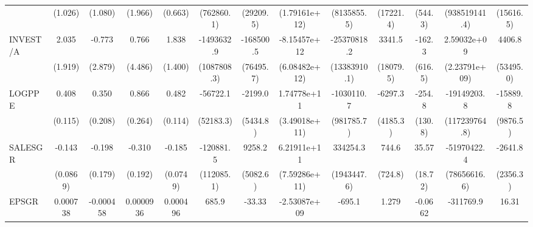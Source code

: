 \begin{table}[htbp]
\begin{tabular}{l*{12}{c}}
                    &     (1.026)         &     (1.080)         &     (1.966)         &     (0.663)         &  (762860.1)         &   (29209.5)         &(1.79161e+12)         & (8135855.5)         &   (17221.4)         &     (544.3)         &(938519141.4)         &   (15616.5)         \\
INVEST/A            &       2.035         &      -0.773         &       0.766         &       1.838         &  -1493632.9         &   -168500.5\sym{**} &-8.15457e+12         & -25370818.2\sym{*}  &      3341.5         &      -162.3         & 2.59032e+09         &      4406.8         \\
                    &     (1.919)         &     (2.879)         &     (4.486)         &     (1.400)         & (1087808.3)         &   (76495.7)         &(6.08482e+12)         &(13383910.1)         &   (18079.5)         &     (616.5)         &(2.23791e+09)         &   (53495.0)         \\
LOGPPE              &       0.408\sym{***}&       0.350         &       0.866\sym{***}&       0.482\sym{***}&    -56722.1         &     -2199.0         & 1.74778e+11         &  -1030110.7         &     -6297.3         &      -254.8\sym{*}  & -19149203.8         &    -15889.8         \\
                    &     (0.115)         &     (0.208)         &     (0.264)         &     (0.114)         &   (52183.3)         &    (5434.8)         &(3.49018e+11)         &  (981785.7)         &    (4185.3)         &     (130.8)         &(117239764.8)         &    (9876.5)         \\
SALESGR             &      -0.143         &      -0.198         &      -0.310         &      -0.185\sym{**} &   -120881.5         &      9258.2\sym{*}  & 6.21911e+11         &    334254.3         &       744.6         &       35.57\sym{*}  & -51970422.4         &     -2641.8         \\
                    &    (0.0869)         &     (0.179)         &     (0.192)         &    (0.0749)         &  (112085.1)         &    (5082.6)         &(7.59286e+11)         & (1943447.6)         &     (724.8)         &     (18.72)         &(78656616.6)         &    (2356.3)         \\
EPSGR               &    0.000738         &   -0.000458         &   0.0000936         &    0.000496         &       685.9         &      -33.33         &-2.53087e+09         &      -695.1         &       1.279         &     -0.0662         &   -311769.9         &       16.31         \\

\end{tabular}
\end{table}
